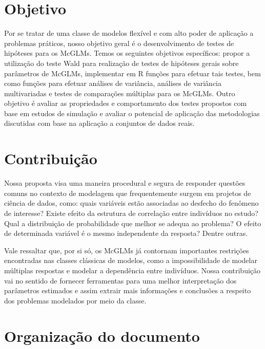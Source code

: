 
\section{Objetivo}

Por se tratar de uma classe de modelos flexível e com alto poder de aplicação a problemas práticos, nosso objetivo geral é o desenvolvimento de testes de hipóteses para os McGLMs. Temos os seguintes objetivos específicos: propor a utilização do teste Wald para realização de testes de hipóteses gerais sobre parâmetros de McGLMs, implementar em R funções para efetuar tais testes, bem como funções para efetuar análises de variância, análises de variância multivariadas e testes de comparações múltiplas para os McGLMs. Outro objetivo é avaliar as propriedades e comportamento dos testes propostos com base em estudos de simulação e avaliar o potencial de aplicação das metodologias discutidas com base na aplicação a conjuntos de dados reais.


\section{Contribuição}

Nossa proposta visa uma maneira procedural e segura de responder questões comuns no contexto de modelagem que frequentemente surgem em projetos de ciência de dados, como: quais variáveis estão associadas ao desfecho do fenômeno de interesse? Existe efeito da estrutura de correlação entre indivíduos no estudo? Qual a distribuição de probabilidade que melhor se adequa ao problema? O efeito de determinada variável é o mesmo independente da resposta? Dentre outras.

Vale ressaltar que, por si só, os McGLMs já contornam importantes restrições encontradas nas classes clássicas de modelos, como a impossibilidade de modelar múltiplas respostas e modelar a dependência entre indivíduos. Nossa contribuição vai no sentido de fornecer ferramentas para uma melhor interpretação dos parâmetros estimados e assim extrair mais informações e conclusões a respeito dos problemas modelados por meio da classe.


\section{Organização do documento}

